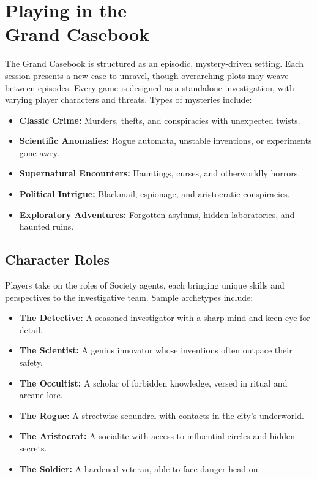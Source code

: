 \section[Playing in the Grand Casebook]{Playing in the\\ Grand Casebook}

The Grand Casebook is structured as an episodic, mystery-driven setting. Each session presents a new case to unravel, though overarching plots may weave between episodes. Every game is designed as a standalone investigation, with varying player characters and threats. Types of mysteries include:

\begin{itemize}
    \item \textbf{Classic Crime:} Murders, thefts, and conspiracies with unexpected twists.
    \item \textbf{Scientific Anomalies:} Rogue automata, unstable inventions, or experiments gone awry.
    \item \textbf{Supernatural Encounters:} Hauntings, curses, and otherworldly horrors.
    \item \textbf{Political Intrigue:} Blackmail, espionage, and aristocratic conspiracies.
    \item \textbf{Exploratory Adventures:} Forgotten asylums, hidden laboratories, and haunted ruins.
\end{itemize}

\subsection{Character Roles}

Players take on the roles of Society agents, each bringing unique skills and perspectives to the investigative team. Sample archetypes include:

\begin{itemize}\raggedright
    \item \textbf{The Detective:} A seasoned investigator with a sharp mind and keen eye for detail.
    \item \textbf{The Scientist:} A genius innovator whose inventions often outpace their safety.
    \item \textbf{The Occultist:} A scholar of forbidden knowledge, versed in ritual and arcane lore.
    \item \textbf{The Rogue:} A streetwise scoundrel with contacts in the city’s underworld.
    \item \textbf{The Aristocrat:} A socialite with access to influential circles and hidden secrets.
    \item \textbf{The Soldier:} A hardened veteran, able to face danger head-on.
\end{itemize}

